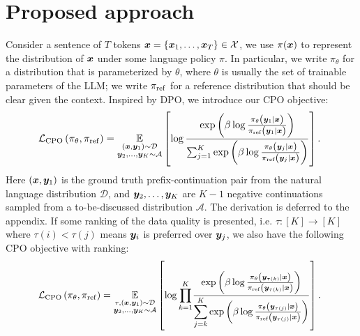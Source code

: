 \section{Proposed approach}\label{sec:approach}
Consider a sentence of $T$ tokens ${\bm{x}}=\{{\bm{x}}_1,\ldots, {\bm{x}}_T\}\in{\mathcal{X}}$,
 we use $\pi({\bm{x}})$ to represent the distribution of ${\bm{x}}$ under some language policy $\pi$. In particular, we write $\pi_\theta$ for a distribution that is parameterized by $\theta$, where $\theta$ is usually the set of trainable parameters of the LLM; we write $\pi_{\operatorname{ref}}$ for a reference distribution that should be clear given the context. Inspired by DPO, we introduce our CPO objective:
\begin{equation}\label{eq:norankcpo}
\resizebox{0.85\columnwidth}{!}{%
$
\begin{split}
		\mathcal{L}_{\mathrm{CPO}}\left(\pi_\theta, \pi_{\mathrm{ref}}\right)=
		\underset{\substack{ (\vx,\vy_1) \sim \mathcal{D} \\  \vy_2, \ldots, \vy_K\sim\mathcal{A}} }{\mathbb{E}} \left[\log \frac{\exp \left(\beta \log \frac{\pi_\theta\left(\vy_1 \mid \vx\right)}{\pi_{\mathrm{ref}}\left(\vy_1 \mid \vx\right)}\right)}{\sum_{j=1}^K \exp \left(\beta \log \frac{\pi_\theta\left(\vy_j \mid \vx\right)}{\pi_{\mathrm{ref}}\left(\vy_j \mid \vx\right)}\right)}\right].
\end{split}
$
}
\end{equation}
Here $({\bm{x}}, {\bm{y}}_1)$ is the ground truth prefix-continuation pair from the natural language distribution $\mathcal{D}$, and ${\bm{y}}_2,\ldots, {\bm{y}}_K$ are $K-1$ negative continuations sampled from a to-be-discussed distribution $\mathcal{A}$. The derivation is deferred to the appendix. If some ranking of the data quality is presented, i.e. $\tau:[K]\to [K]$ where $\tau(i)<\tau(j)$ means ${\bm{y}}_i$ is preferred over ${\bm{y}}_j$, we also have the following CPO objective with ranking:
\begin{equation}\label{eq:rankcpo}
\resizebox{0.85\columnwidth}{!}{%
$
\begin{split}
		\mathcal{L}_{\mathrm{CPO}}\left(\pi_\theta, \pi_{\mathrm{ref}}\right)=
	\underset{\substack{\tau, (\vx,\vy_1) \sim \mathcal{D} \\  \vy_2, \ldots, \vy_K\sim\mathcal{A}} }{\mathbb{E}} \left[\log {\displaystyle \prod_{k=1}^K} \frac{\exp \left(\beta \log \frac{\pi_\theta\left(\vy_{\tau(k)} \mid \vx\right)}{\pi_{\mathrm{ref}}\left(\vy_{\tau(k)} \mid \vx\right)}\right)}{{\displaystyle \sum_{j=k}^K} \exp \left(\beta \log \frac{\pi_\theta\left(\vy_{\tau(j)} \mid \vx\right)}{\pi_{\mathrm{ref}}\left(\vy_{\tau(j)} \mid \vx\right)}\right)}\right].
\end{split}
$
}
\end{equation}

